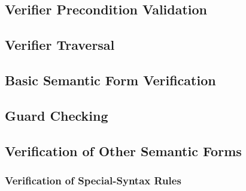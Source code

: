 \subsection{Verifier Precondition Validation} %
\label{sub:verifier_precondition_validation}


\subsection{Verifier Traversal} %
\label{sub:verifier_traversal}


\subsection{Basic Semantic Form Verification} %
\label{sub:basic_semantic_form_verification}


\subsection{Guard Checking} %
\label{sub:guard_checking}


\subsection{Verification of Other Semantic Forms} %
\label{sub:verification_of_other_semantic_forms}

\subsubsection{Verification of Special-Syntax Rules} %
\label{ssub:verification_of_special_syntax_rules}


